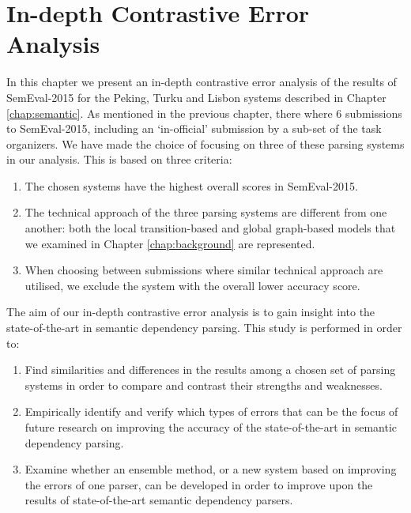 \chapter{In-depth Contrastive Error Analysis}
\label{chap:analysis}



In this chapter we present an in-depth contrastive error analysis of the results of SemEval-2015 for the Peking, Turku and Lisbon systems described in Chapter \ref{chap:semantic}. As mentioned in the previous chapter, there where 6 submissions to SemEval-2015, including an `in-official' submission by a sub-set of the task organizers. We have made the choice of focusing on three of these parsing systems in our analysis. This is based on three criteria:

\begin{enumerate}
    \item The chosen systems have the highest overall scores in SemEval-2015.
    \item The technical approach of the three parsing systems are different from one another: both the local transition-based and global graph-based models that we examined in Chapter \ref{chap:background} are represented.
    \item When choosing between submissions where similar technical approach are utilised, we exclude the system with the overall lower accuracy score.
\end{enumerate}

The aim of our in-depth contrastive error analysis is to gain insight into the state-of-the-art in semantic dependency parsing. This study is performed in order to:

\begin{enumerate}
    \item Find similarities and differences in the results among a chosen set of parsing systems in order to compare and contrast their strengths and weaknesses.
    \item Empirically identify and verify which types of errors that can be the focus of future research on improving the accuracy of the state-of-the-art in semantic dependency parsing.
    \item Examine whether an ensemble method, or a new system based on improving the errors of one parser, can be developed in order to improve upon the results of state-of-the-art semantic dependency parsers.
\end{enumerate}

